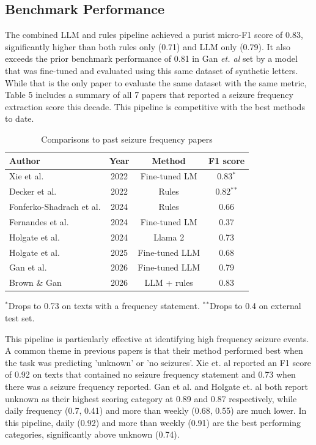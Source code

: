 \documentclass[conference]{IEEEtran}
\begin{document}
\subsection{Benchmark Performance}

The combined LLM and rules pipeline achieved a purist 
micro-F1 score of 0.83, significantly higher than both 
rules only (0.71) and LLM only (0.79). It also exceeds the 
prior benchmark performance of 0.81 in Gan \emph{et. al} 
set by a model that was fine-tuned and evaluated using 
this same dataset of synthetic letters. While that is the only
paper to evaluate the same dataset with the same metric, 
Table 5 includes a summary of all 7 papers that reported 
a seizure frequency extraction score this decade. This 
pipeline is competitive with the best methods to date.

\begin{table}[!t]
\caption{Comparisons to past seizure frequency papers}
\label{tab:frequency}
\centering
\begin{tabularx}{\linewidth}{Yccc}
\toprule
\textbf{Author} & \textbf{Year} & \textbf{Method} & \textbf{F1 score} \\
\midrule
Xie et al. & 2022 & Fine-tuned LM & 0.83$^\ast$ \\
Decker et al. & 2022 & Rules & 0.82$^\ast$$^\ast$ \\
Fonferko-Shadrach et al. & 2024 & Rules & 0.66 \\
Fernandes et al. & 2024 & Fine-tuned LM & 0.37 \\
Holgate et al. & 2024 & Llama 2 & 0.73 \\
Holgate et al. & 2025 & Fine-tuned LLM & 0.68 \\
Gan et al. & 2026 & Fine-tuned LLM & 0.79 \\
\midrule
Brown \& Gan & 2026 & LLM + rules & 0.83 \\
\bottomrule
\end{tabularx}

\vspace*{8pt}
\begin{minipage}{\linewidth}
\raggedright\footnotesize
$^\ast$Drops to 0.73 on texts with a frequency statement.
$^\ast$$^\ast$Drops to 0.4 on external test set. 
\end{minipage}
\end{table}

This pipeline is particularly effective at identifying 
high frequency seizure events. A common theme in 
previous papers is that their method performed 
best when the task was predicting  'unknown' or  
'no seizures'. Xie et. al reported an F1 score of 0.92 on 
texts that contained no seizure frequency statement and 
0.73 when there was a seizure frequency reported. Gan 
et al. and Holgate et. al both report unknown as their 
highest scoring category at 0.89 and 0.87 respectively, 
while daily frequency (0.7, 0.41) and more than weekly 
(0.68, 0.55) are much lower. In this pipeline, daily (0.92) 
and more than weekly (0.91) are the best performing 
categories, significantly above unknown (0.74). 
\end{document}
